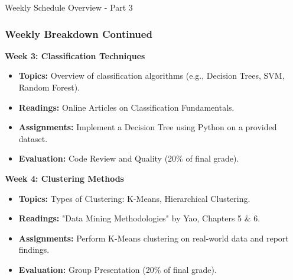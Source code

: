 \documentclass[aspectratio=169]{beamer}
\begin{document}
\begin{frame}[fragile]{Weekly Schedule Overview - Part 3}
  \frametitle{Weekly Breakdown Continued}
  
  \textbf{Week 3: Classification Techniques}
  \begin{itemize}
    \item \textbf{Topics:} Overview of classification algorithms (e.g., Decision Trees, SVM, Random Forest).
    \item \textbf{Readings:} Online Articles on Classification Fundamentals.
    \item \textbf{Assignments:} Implement a Decision Tree using Python on a provided dataset.
    \item \textbf{Evaluation:} Code Review and Quality (20\% of final grade).
  \end{itemize}

  \textbf{Week 4: Clustering Methods}
  \begin{itemize}
    \item \textbf{Topics:} Types of Clustering: K-Means, Hierarchical Clustering.
    \item \textbf{Readings:} "Data Mining Methodologies" by Yao, Chapters 5 \& 6.
    \item \textbf{Assignments:} Perform K-Means clustering on real-world data and report findings.
    \item \textbf{Evaluation:} Group Presentation (20\% of final grade).
  \end{itemize}
  
\end{frame}
\end{document}
